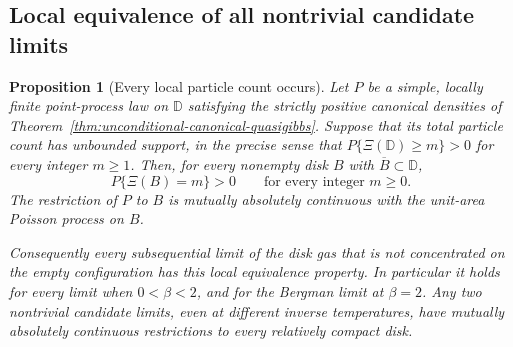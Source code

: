 \documentclass[11pt,a4paper]{article}
\numberwithin{equation}{section}
\newtheorem{proposition}[theorem]{Proposition}
\theoremstyle{definition}
\theoremstyle{remark}
\newcommand{\D}{\mathbb D}
\begin{document}
\subsection{Local equivalence of all nontrivial candidate limits}
\label{sec:local-poisson-equivalence}

\begin{proposition}[Every local particle count occurs]
\label{prop:local-poisson-equivalence}
Let $P$ be a simple, locally finite point-process law on $\D$
satisfying the strictly positive canonical densities of
Theorem~\ref{thm:unconditional-canonical-quasigibbs}. Suppose that
its total particle count has unbounded support, in the precise sense
that $P\{\Xi(\D)\ge m\}>0$ for every integer $m\ge1$.
Then, for every nonempty disk $B$ with $\overline B\subset\D$,
\begin{equation}
 P\{\Xi(B)=m\}>0\qquad\text{for every integer }m\ge0.
 \label{eq:all-unconditional-local-counts-positive}
\end{equation}
The restriction of $P$ to $B$ is mutually absolutely continuous
with the unit-area Poisson process on $B$.

Consequently every subsequential limit of the disk gas that is not
concentrated on the empty configuration has this local equivalence
property. In particular it holds for every limit when $0<\beta<2$,
and for the Bergman limit at $\beta=2$. Any two nontrivial candidate
limits, even at different inverse temperatures, have mutually
absolutely continuous restrictions to every relatively compact disk.
\end{proposition}
\end{document}
